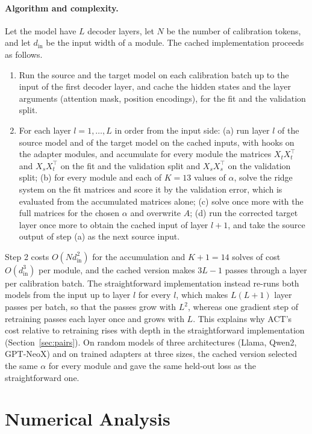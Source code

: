 \documentclass[preprint,12pt,authoryear]{elsarticle}
\begin{document}
\paragraph{Algorithm and complexity.} Let the model have $L$ decoder layers, let $N$ be the number of calibration tokens, and let $d_{\text{in}}$ be the input width of a module. The cached implementation proceeds as follows.
\begin{enumerate}
\item Run the source and the target model on each calibration batch up to the input of the first decoder layer, and cache the hidden states and the layer arguments (attention mask, position encodings), for the fit and the validation split.
\item For each layer $l=1,\dots,L$ in order from the input side: (a) run layer $l$ of the source model and of the target model on the cached inputs, with hooks on the adapter modules, and accumulate for every module the matrices $X_tX_t^{\top}$ and $X_sX_t^{\top}$ on the fit and the validation split and $X_sX_s^{\top}$ on the validation split; (b) for every module and each of $K=13$ values of $\alpha$, solve the ridge system on the fit matrices and score it by the validation error, which is evaluated from the accumulated matrices alone; (c) solve once more with the full matrices for the chosen $\alpha$ and overwrite $A$; (d) run the corrected target layer once more to obtain the cached input of layer $l+1$, and take the source output of step (a) as the next source input.
\end{enumerate}
Step 2 costs $O(Nd_{\text{in}}^2)$ for the accumulation and $K+1=14$ solves of cost $O(d_{\text{in}}^3)$ per module, and the cached version makes $3L-1$ passes through a layer per calibration batch. The straightforward implementation instead re-runs both models from the input up to layer $l$ for every $l$, which makes $L(L+1)$ layer passes per batch, so that the passes grow with $L^2$, whereas one gradient step of retraining passes each layer once and grows with $L$. This explains why ACT's cost relative to retraining rises with depth in the straightforward implementation (Section~\ref{sec:pairs}). On random models of three architectures (Llama, Qwen2, GPT-NeoX) and on trained adapters at three sizes, the cached version selected the same $\alpha$ for every module and gave the same held-out loss as the straightforward one.

\section{Numerical Analysis}\label{sec:numerical}
\end{document}
